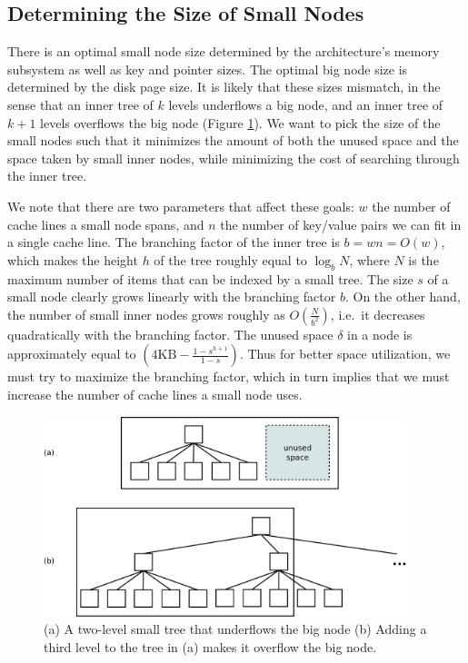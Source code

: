 \documentclass{article}
\begin{document}
\subsection{Determining the Size of Small Nodes}

There is an optimal small node size determined by the architecture's memory subsystem as well as key
and pointer sizes. The optimal big node size is determined by the disk page size.
It is likely that these sizes mismatch, in the sense that an
inner tree of $k$ levels underflows a big node, and an inner tree of $k+1$ levels
overflows the big node (Figure \ref{fig:node_mismatch}). We want to pick the size of
the small nodes such that it minimizes the amount of both the unused space and the space
taken by small inner nodes, while minimizing the cost of searching through the
inner tree. 

We note that there are two parameters that affect these goals: $w$
the number of cache lines a small node spans, and $n$ the number of key/value
pairs we can fit in a single cache line. 
The branching factor of the inner tree is $b=wn = O(w)$, which makes the height
$h$ of the tree roughly equal to $\log_b N$, where $N$ is the maximum number of
items that can be indexed by a small tree. The size $s$ of a small node clearly grows
linearly with the branching factor $b$. On the other hand, the number of small inner
nodes grows roughly as $\displaystyle O\left(\frac{N}{b^2}\right)$, i.e.\ it decreases quadratically with the
branching factor. The unused space $\delta$ in a node is approximately equal to
$\displaystyle \left(4\text{KB} - \frac{1-s^{h+1}}{1-s}\right)$. Thus for better space utilization, we must try
to maximize the branching factor, which in turn implies that we must increase the
number of cache lines a small node uses.

\begin{figure}[h]
\begin{center}
\includegraphics[width=300pt]{node_mismatch}
\end{center}
\caption{
(a) A two-level small tree that underflows the big node (b) Adding a third level to the tree in (a)
makes it overflow the big node. 
}
\label{fig:node_mismatch}
\end{figure}
\end{document}
